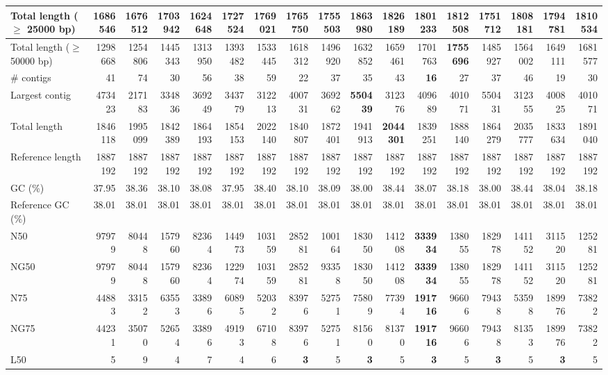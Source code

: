 \documentclass[12pt,a4paper]{article}
\begin{document}
\begin{table}[ht]
\begin{center}
\begin{tabular}{|l*{16}{|r}|}
Total length ($\geq$ 25000 bp) & 1686546 & 1676512 & 1703942 & 1624648 & 1727524 & 1769021 & 1765750 & 1755503 & {\bf 1863980} & 1826189 & 1801233 & 1812508 & 1751712 & 1808181 & 1794781 & 1810534 \\ \hline
Total length ($\geq$ 50000 bp) & 1298668 & 1254806 & 1445343 & 1313950 & 1393482 & 1533445 & 1618312 & 1496920 & 1632852 & 1659461 & 1701763 & {\bf 1755696} & 1485927 & 1564002 & 1649111 & 1681577 \\ \hline
\# contigs & 41 & 74 & 30 & 56 & 38 & 59 & 22 & 37 & 35 & 43 & {\bf 16} & 27 & 37 & 46 & 19 & 30 \\ \hline
Largest contig & 473423 & 217183 & 334836 & 369249 & 343779 & 312213 & 400731 & 369262 & {\bf 550439} & 312376 & 409689 & 401071 & 550431 & 312355 & 400825 & 401071 \\ \hline
Total length & 1846118 & 1995099 & 1842389 & 1864193 & 1854153 & 2022140 & 1840807 & 1872401 & 1941913 & {\bf 2044301} & 1839251 & 1888140 & 1864279 & 2035777 & 1833634 & 1891040 \\ \hline
Reference length & 1887192 & 1887192 & 1887192 & 1887192 & 1887192 & 1887192 & 1887192 & 1887192 & 1887192 & 1887192 & 1887192 & 1887192 & 1887192 & 1887192 & 1887192 & 1887192 \\ \hline
GC (\%) & 37.95 & 38.36 & 38.10 & 38.08 & 37.95 & 38.40 & 38.10 & 38.09 & 38.00 & 38.44 & 38.07 & 38.18 & 38.00 & 38.44 & 38.04 & 38.18 \\ \hline
Reference GC (\%) & 38.01 & 38.01 & 38.01 & 38.01 & 38.01 & 38.01 & 38.01 & 38.01 & 38.01 & 38.01 & 38.01 & 38.01 & 38.01 & 38.01 & 38.01 & 38.01 \\ \hline
N50 & 97979 & 80448 & 157960 & 82364 & 144973 & 103159 & 285281 & 100164 & 183050 & 141208 & {\bf 333934} & 138055 & 182978 & 141152 & 311520 & 125281 \\ \hline
NG50 & 97979 & 80448 & 157960 & 82364 & 122974 & 103159 & 285281 & 93358 & 183050 & 141208 & {\bf 333934} & 138055 & 182978 & 141152 & 311520 & 125281 \\ \hline
N75 & 44883 & 33152 & 63553 & 33896 & 60895 & 52032 & 83976 & 52751 & 75809 & 77394 & {\bf 191716} & 96606 & 79438 & 53598 & 189976 & 73822 \\ \hline
NG75 & 44231 & 35070 & 52654 & 33896 & 49193 & 67108 & 83976 & 52751 & 81560 & 81370 & {\bf 191716} & 96606 & 79438 & 81353 & 189976 & 73822 \\ \hline
L50 & 5 & 9 & 4 & 7 & 4 & 6 & {\bf 3} & 5 & {\bf 3} & 5 & {\bf 3} & 5 & {\bf 3} & 5 & {\bf 3} & 5 \\ \hline

\end{tabular}
\end{center}
\end{table}
\end{document}
